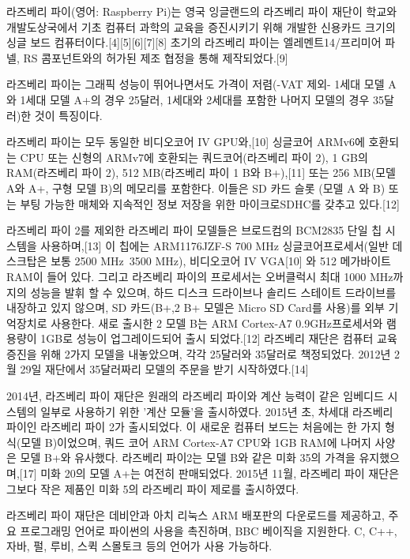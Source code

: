 \documentclass[12pt, a4paper, oneside]{book}
\begin{document}
라즈베리 파이(영어: Raspberry Pi)는 영국 잉글랜드의 라즈베리 파이 재단이 학교와 개발도상국에서 기초 컴퓨터 과학의 교육을 증진시키기 위해 개발한 신용카드 크기의 싱글 보드 컴퓨터이다.[4][5][6][7][8] 초기의 라즈베리 파이는 엘레멘트14/프리미어 파넬, RS 콤포넌트와의 허가된 제조 협정을 통해 제작되었다.[9]

라즈베리 파이는 그래픽 성능이 뛰어나면서도 가격이 저렴(-VAT 제외- 1세대 모델 A와 1세대 모델 A+의 경우 25달러, 1세대와 2세대를 포함한 나머지 모델의 경우 35달러)한 것이 특징이다.

라즈베리 파이는 모두 동일한 비디오코어 IV GPU와,[10] 싱글코어 ARMv6에 호환되는 CPU 또는 신형의 ARMv7에 호환되는 쿼드코어(라즈베리 파이 2), 1 GB의 RAM(라즈베리 파이 2), 512 MB(라즈베리 파이 1 B와 B+),[11] 또는 256 MB(모델 A와 A+, 구형 모델 B)의 메모리를 포함한다. 이들은 SD 카드 슬롯 (모델 A 와 B) 또는 부팅 가능한 매체와 지속적인 정보 저장을 위한 마이크로SDHC를 갖추고 있다.[12]

라즈베리 파이 2를 제외한 라즈베리 파이 모델들은 브로드컴의 BCM2835 단일 칩 시스템을 사용하며,[13] 이 칩에는 ARM1176JZF-S 700 MHz 싱글코어프로세서(일반 데스크탑은 보통 2500 MHz~3500 MHz), 비디오코어 IV VGA[10] 와 512 메가바이트 RAM이 들어 있다. 그리고 라즈베리 파이의 프로세서는 오버클럭시 최대 1000 MHz까지의 성능을 발휘 할 수 있으며, 하드 디스크 드라이브나 솔리드 스테이트 드라이브를 내장하고 있지 않으며, SD 카드(B+,2 B+ 모델은 Micro SD Card를 사용)를 외부 기억장치로 사용한다. 새로 출시한 2 모델 B는 ARM Cortex-A7 0.9GHz프로세서와 램용량이 1GB로 성능이 업그레이드되어 출시 되었다.[12] 라즈베리 재단은 컴퓨터 교육 증진을 위해 2가지 모델을 내놓았으며, 각각 25달러와 35달러로 책정되었다. 2012년 2월 29일 재단에서 35달러짜리 모델의 주문을 받기 시작하였다.[14]

2014년, 라즈베리 파이 재단은 원래의 라즈베리 파이와 계산 능력이 같은 임베디드 시스템의 일부로 사용하기 위한 '계산 모듈'을 출시하였다. 
2015년 초, 차세대 라즈베리 파이인 라즈베리 파이 2가 출시되었다. 이 새로운 컴퓨터 보드는 처음에는 한 가지 형식(모델 B)이었으며, 쿼드 코어 ARM Cortex-A7 CPU와 1GB RAM에 나머지 사양은 모델 B+와 유사했다. 라즈베리 파이2는 모델 B와 같은 미화 35의 가격을 유지했으며,[17] 미화 20의 모델 A+는 여전히 판매되었다. 2015년 11월, 라즈베리 파이 재단은 그보다 작은 제품인 미화 5의 라즈베리 파이 제로를 출시하였다.

라즈베리 파이 재단은 데비안과 아치 리눅스 ARM 배포판의 다운로드를 제공하고, 주요 프로그래밍 언어로 파이썬의 사용을 촉진하며, BBC 베이직을 지원한다. C, C++, 자바, 펄, 루비, 스퀵 스몰토크 등의 언어가 사용 가능하다.
\end{document}
